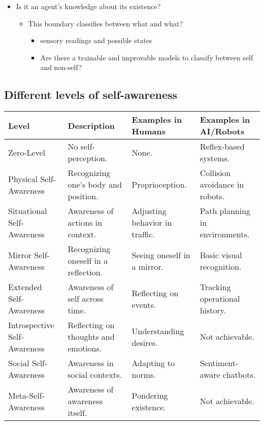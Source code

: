     \begin{itemize}
        \item Is it an agent's knowledge about its existence?
        
        \begin{itemize}
            \item This boundary classifies between what and what?
            \begin{itemize}
                \item sensory readings and possible states
                \item Are there a trainable and improvable models to classify between self and non-self?
            \end{itemize}
        \end{itemize}
    \end{itemize}
    \subsection{Different levels of self-awareness}
        \begin{tabular}{|l|l|l|l|}
        \hline
            \textbf{Level} & \textbf{Description} & \textbf{Examples in Humans} & \textbf{Examples in AI/Robots} \\ \hline
            Zero-Level & No self-perception. & None. & Reflex-based systems. \\ \hline
            Physical Self-Awareness & Recognizing one’s body and position. & Proprioception. & Collision avoidance in robots. \\ \hline
            Situational Self-Awareness & Awareness of actions in context. & Adjusting behavior in traffic. & Path planning in environments. \\ \hline
            Mirror Self-Awareness & Recognizing oneself in a reflection. & Seeing oneself in a mirror. & Basic visual recognition. \\ \hline
            Extended Self-Awareness & Awareness of self across time. & Reflecting on events. & Tracking operational history. \\ \hline
            Introspective Self-Awareness & Reflecting on thoughts and emotions. & Understanding desires. & Not achievable. \\ \hline
            Social Self-Awareness & Awareness in social contexts. & Adapting to norms. & Sentiment-aware chatbots. \\ \hline
            Meta-Self-Awareness & Awareness of awareness itself. & Pondering existence. & Not achievable. \\ \hline
        \end{tabular}
